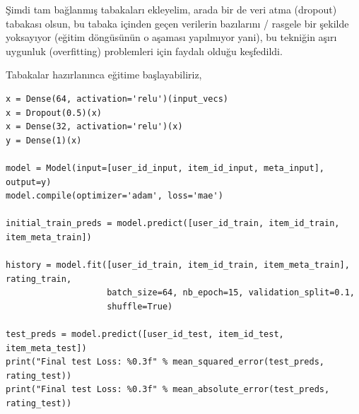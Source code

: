 \documentclass[12pt,fleqn]{article}\usepackage{../../common}
\begin{document}
Şimdi tam bağlanmış tabakaları ekleyelim, arada bir de veri atma (dropout)
tabakası olsun, bu tabaka içinden geçen verilerin bazılarını / rasgele bir
şekilde yoksayıyor (eğitim döngüsünün o aşaması yapılmıyor yani), bu
tekniğin aşırı uygunluk (overfitting) problemleri için faydalı olduğu
keşfedildi. 

Tabakalar hazırlanınca eğitime başlayabiliriz,

\begin{verbatim}
x = Dense(64, activation='relu')(input_vecs)
x = Dropout(0.5)(x)
x = Dense(32, activation='relu')(x)
y = Dense(1)(x)

model = Model(input=[user_id_input, item_id_input, meta_input], output=y)
model.compile(optimizer='adam', loss='mae')

initial_train_preds = model.predict([user_id_train, item_id_train, item_meta_train])

history = model.fit([user_id_train, item_id_train, item_meta_train], rating_train,
                    batch_size=64, nb_epoch=15, validation_split=0.1,
                    shuffle=True)

test_preds = model.predict([user_id_test, item_id_test, item_meta_test])
print("Final test Loss: %0.3f" % mean_squared_error(test_preds, rating_test))
print("Final test Loss: %0.3f" % mean_absolute_error(test_preds, rating_test))
\end{verbatim}
\end{document}
